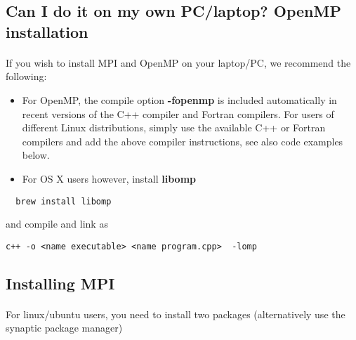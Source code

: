 \documentclass[%
oneside,                 %
final,                   %
10pt]{article}
\begin{document}
\subsection*{Can I do it on my own PC/laptop? OpenMP installation}

\paragraph{}
If you wish to install MPI and OpenMP 
on your laptop/PC, we recommend the following:

\begin{itemize}
\item For OpenMP, the compile option \textbf{-fopenmp} is included automatically in recent versions of the C++ compiler and Fortran compilers. For users of different Linux distributions, simply use the available C++ or Fortran compilers and add the above compiler instructions, see also code examples below.

\item For OS X users however, install \textbf{libomp}
\end{itemize}

\noindent


\begin{verbatim}
  brew install libomp

\end{verbatim}

and compile and link as


\begin{verbatim}
c++ -o <name executable> <name program.cpp>  -lomp

\end{verbatim}



\subsection*{Installing MPI}

\paragraph{}
For linux/ubuntu users, you need to install two packages (alternatively use the synaptic package manager)
\end{document}
